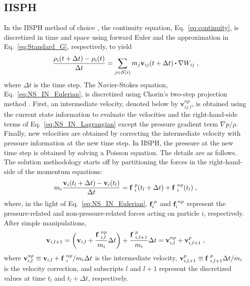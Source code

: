 \subsection{IISPH}
\label{sec:IISPH}
In the IISPH method of choice \cite{ihmsen2014implicit}, the continuity equation, Eq.~\ref{eq:continuity}, is discretized in time and space using forward Euler and the approximation in Eq.~\ref{eq:Standard_G}, respectively, to yield
\begin{equation}\label{eq:rhocontinuity}
\frac{\rho_i(t+\Delta t)-\rho_i(t)}{\Delta t}=\sum_{j \in {\cal S}(i)} m_j \mathbf v_{ij}(t+\Delta t)\bigcdot  \nabla W_{ij}\;,
\end{equation}
where $\Delta t$ is the time step. The Navier-Stokes equation, Eq.~\ref{eq:NS_IN_Eulerian}, is discretized using Chorin's two-step projection method \cite{chorin1968numerical}. First, an intermediate velocity, denoted below by $\mathbf v_{ij,l}^{np}$, is obtained using the current state information to evaluate the velocities and the right-hand-side terms of Eq.~\ref{eq:NS_IN_Lagrangian} except the pressure gradient term $\nabla p/\rho$. Finally, new velocities are obtained by correcting the intermediate velocity with pressure information at the new time step. In IISPH, the pressure at the new time step is obtained by solving a Poisson equation. The details are as follows. The solution methodology starts off by partitioning the forces in the right-hand-side of the momentum equations:
\begin{equation}\label{eq:continuityDes}
m_i \frac{\mathbf v_i(t_l+\Delta t)-\mathbf v_i(t_l)}{\Delta t}={\bf f}\;^p_i(t_l+\Delta t)+{\bf f}\;^{np}_i(t_l)\;,
\end{equation}
where, in the light of Eq.~\ref{eq:NS_IN_Eulerian}, ${\bf f}_i^{\:p}$ and ${\bf f}_i^{\:np}$ represent the pressure-related and non-pressure-related forces acting on particle $i$, respectively. After simple manipulations,
\begin{equation}\label{eq:seconLaw}
\mathbf v_{i,l+1}=\bigg(\mathbf v_{i,l}+ \frac{{\bf f}\;^{np}_{i,l}}{ m_i}\Delta t\bigg)+ \frac{{\bf f}\;^{p}_{i,l+1}}{ m_i}\Delta t=\mathbf v^{np}_{i,l}+\mathbf v^{p}_{i,l+1}\;,
\end{equation}
where $\mathbf v^{np}_{i,l} \equiv \mathbf v_{i,l}+ {{\bf f}\;^{np}_i}/{ m_i}\Delta t$ is the intermediate velocity, $\mathbf v^{p}_{i,l+1} \equiv {{\bf f}\;^{p}_{i,l+1}}\Delta t/{ m_i}$ is the velocity correction, and subscripts $l$ and $l+1$ represent the discretized values at time $t_l$ and $t_l+\Delta t$, respectively. 

